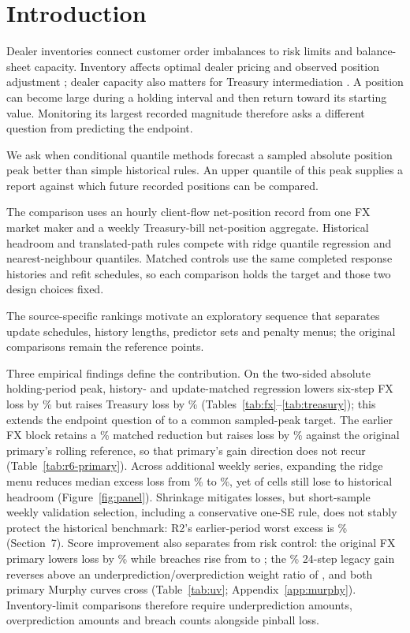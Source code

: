\section{Introduction}
Dealer inventories connect customer order imbalances to risk limits and balance-sheet capacity. Inventory affects optimal dealer pricing and observed position adjustment \citep{ho1981,lyons1995}; dealer capacity also matters for Treasury intermediation \citep{duffie2023}. A position can become large during a holding interval and then return toward its starting value. Monitoring its largest recorded magnitude therefore asks a different question from predicting the endpoint.

We ask when conditional quantile methods forecast a sampled absolute position peak better than simple historical rules. An upper quantile of this peak supplies a report against which future recorded positions can be compared.

The comparison uses an hourly client-flow net-position record from one FX market maker and a weekly Treasury-bill net-position aggregate. Historical headroom and translated-path rules compete with ridge quantile regression and nearest-neighbour quantiles. Matched controls use the same completed response histories and refit schedules, so each comparison holds the target and those two design choices fixed.

The source-specific rankings motivate an exploratory sequence that separates update schedules, history lengths, predictor sets and penalty menus; the original comparisons remain the reference points.

Three empirical findings define the contribution. On the two-sided absolute holding-period peak, history- and update-matched regression lowers six-step FX loss by \FXMatchedGain{}\% but raises Treasury loss by \TreasuryOriginalExcess{}\% (Tables~\ref{tab:fx}--\ref{tab:treasury}); this extends the endpoint question of \citet{wisniewski2020} to a common sampled-peak target. The earlier FX block retains a \RWritingMatchedGain{}\% matched reduction but raises loss by \RWritingOriginalExcess{}\% against the original primary's rolling reference, so that primary's gain direction does not recur (Table~\ref{tab:r6-primary}). Across \PanelSeriesCount{} additional weekly series, expanding the ridge menu reduces median excess loss from \PanelOriginalMedian{}\% to \PanelExpandedMedian{}\%, yet \PanelExpandedLosses{} of \PanelCellCount{} cells still lose to historical headroom (Figure~\ref{fig:panel}). Shrinkage mitigates losses, but short-sample weekly validation selection, including a conservative one-SE rule, does not stably protect the historical benchmark: R2's earlier-period worst excess is \RWeeklyTwoWorst{}\% (Section~7). Score improvement also separates from risk control: the original FX primary lowers loss by \FXPrimaryGain{}\% while breaches rise from \FXReferenceBreaches{} to \FXPrimaryBreaches{}; the \FXLegacyGain{}\% 24-step legacy gain reverses above an underprediction/overprediction weight ratio of \FXLegacyCrossing{}, and both primary Murphy curves cross (Table~\ref{tab:uv}; Appendix~\ref{app:murphy}). Inventory-limit comparisons therefore require underprediction amounts, overprediction amounts and breach counts alongside pinball loss.

